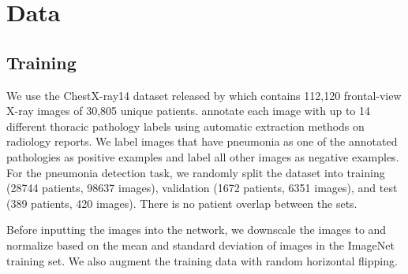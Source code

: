 \documentclass{article}
\begin{document}
\section{Data}
\subsection{Training}
  We use the ChestX-ray14 dataset released by \citet{Wang2017} which contains 112,120 frontal-view X-ray images of 30,805 unique patients. \citet{Wang2017} annotate each image with up to 14 different thoracic pathology labels using automatic extraction methods on radiology reports. We label images that have pneumonia as one of the annotated pathologies as positive examples and label all other images as negative examples. For the pneumonia detection task, we randomly split the dataset into training (28744 patients, 98637 images), validation (1672 patients, 6351 images), and test (389 patients, 
420 images). There is no patient overlap between the sets.

Before inputting the images into the network, we downscale the images to  and normalize based on the mean and standard deviation of images in the ImageNet training set. We also augment the training data with random horizontal flipping.
\end{document}
